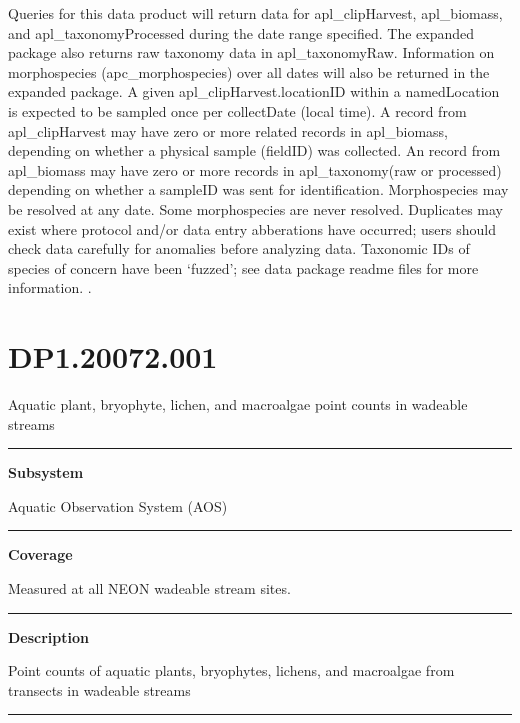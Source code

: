\documentclass[]{article}
\begin{document}
Queries for this data product will return data for apl\_clipHarvest,
apl\_biomass, and apl\_taxonomyProcessed during the date range
specified. The expanded package also returns raw taxonomy data in
apl\_taxonomyRaw. Information on morphospecies (apc\_morphospecies) over
all dates will also be returned in the expanded package. A given
apl\_clipHarvest.locationID within a namedLocation is expected to be
sampled once per collectDate (local time). A record from
apl\_clipHarvest may have zero or more related records in apl\_biomass,
depending on whether a physical sample (fieldID) was collected. An
record from apl\_biomass may have zero or more records in
apl\_taxonomy(raw or processed) depending on whether a sampleID was sent
for identification. Morphospecies may be resolved at any date. Some
morphospecies are never resolved. Duplicates may exist where protocol
and/or data entry abberations have occurred; users should check data
carefully for anomalies before analyzing data. Taxonomic IDs of species
of concern have been `fuzzed'; see data package readme files for more
information. \newpage
.

\section{DP1.20072.001}\label{dp1.20072.001}

Aquatic plant, bryophyte, lichen, and macroalgae point counts in
wadeable streams

\begin{center}\rule{0.5\linewidth}{\linethickness}\end{center}

\textbf{Subsystem}

Aquatic Observation System (AOS)

\begin{center}\rule{0.5\linewidth}{\linethickness}\end{center}

\textbf{Coverage}

Measured at all NEON wadeable stream sites.

\begin{center}\rule{0.5\linewidth}{\linethickness}\end{center}

\textbf{Description}

Point counts of aquatic plants, bryophytes, lichens, and macroalgae from
transects in wadeable streams

\begin{center}\rule{0.5\linewidth}{\linethickness}\end{center}
\end{document}
